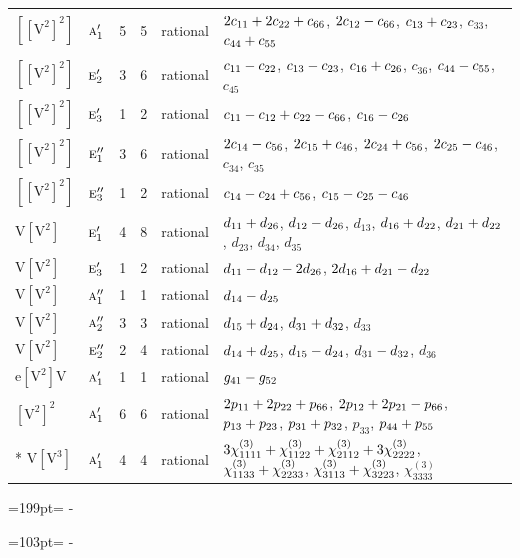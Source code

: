 \documentclass[10pt,a4paper]{article}
\newcommand{\needspace}[1]{\par\penalty-100\begingroup\dimen0=#1\relax\dimen2=\pagegoal
  \advance\dimen2-\pagetotal\ifdim\dimen0>\dimen2\relax\ifdim\dimen2>0pt\vfil\break\fi\fi
  \endgroup}
\numberwithin{equation}{section}
\newcommand{\irr}[1]{\text{\normalfont\scshape #1}}
\newcommand{\jahn}[1]{\mathrm{#1}}
\newlength{\fillwidth}\newlength{\cellwidth}\newlength{\colwidth}
\newcommand{\signbreak}{\penalty100\relax}
\begin{document}
{\begin{longtable}{@{}llrrl>{\RaggedRight\arraybackslash}p{\fillwidth}@{}}
$\jahn{[[V^{2}]^{2}]}$ & $\irr{a}_{1}'$ & 5 & 5 & rational & $2c_{11} +\signbreak 2c_{22} +\signbreak c_{66}$, $2c_{12} -\signbreak c_{66}$, $c_{13} +\signbreak c_{23}$, $c_{33}$, $c_{44} +\signbreak c_{55}$\\
$\jahn{[[V^{2}]^{2}]}$ & $\irr{e}_{2}'$ & 3 & 6 & rational & $c_{11} -\signbreak c_{22}$, $c_{13} -\signbreak c_{23}$, $c_{16} +\signbreak c_{26}$, $c_{36}$, $c_{44} -\signbreak c_{55}$, $c_{45}$\\
$\jahn{[[V^{2}]^{2}]}$ & $\irr{e}_{3}'$ & 1 & 2 & rational & $c_{11} -\signbreak c_{12} +\signbreak c_{22} -\signbreak c_{66}$, $c_{16} -\signbreak c_{26}$\\
$\jahn{[[V^{2}]^{2}]}$ & $\irr{e}_{1}''$ & 3 & 6 & rational & $2c_{14} -\signbreak c_{56}$, $2c_{15} +\signbreak c_{46}$, $2c_{24} +\signbreak c_{56}$, $2c_{25} -\signbreak c_{46}$, $c_{34}$, $c_{35}$\\
$\jahn{[[V^{2}]^{2}]}$ & $\irr{e}_{3}''$ & 1 & 2 & rational & $c_{14} -\signbreak c_{24} +\signbreak c_{56}$, $c_{15} -\signbreak c_{25} -\signbreak c_{46}$\\
$\jahn{V[V^{2}]}$ & $\irr{e}_{1}'$ & 4 & 8 & rational & $d_{11} +\signbreak d_{26}$, $d_{12} -\signbreak d_{26}$, $d_{13}$, $d_{16} +\signbreak d_{22}$, $d_{21} +\signbreak d_{22}$, $d_{23}$, $d_{34}$, $d_{35}$\\
$\jahn{V[V^{2}]}$ & $\irr{e}_{3}'$ & 1 & 2 & rational & $d_{11} -\signbreak d_{12} -\signbreak 2d_{26}$, $2d_{16} +\signbreak d_{21} -\signbreak d_{22}$\\
$\jahn{V[V^{2}]}$ & $\irr{a}_{1}''$ & 1 & 1 & rational & $d_{14} -\signbreak d_{25}$\\
$\jahn{V[V^{2}]}$ & $\irr{a}_{2}''$ & 3 & 3 & rational & $d_{15} +\signbreak d_{24}$, $d_{31} +\signbreak d_{32}$, $d_{33}$\\
$\jahn{V[V^{2}]}$ & $\irr{e}_{2}''$ & 2 & 4 & rational & $d_{14} +\signbreak d_{25}$, $d_{15} -\signbreak d_{24}$, $d_{31} -\signbreak d_{32}$, $d_{36}$\\
$\jahn{e[V^{2}]V}$ & $\irr{a}_{1}'$ & 1 & 1 & rational & $\mathnormal{g}_{41} -\signbreak \mathnormal{g}_{52}$\\
$\jahn{[V^{2}]^{2}}$ & $\irr{a}_{1}'$ & 6 & 6 & rational & $2p_{11} +\signbreak 2p_{22} +\signbreak p_{66}$, $2p_{12} +\signbreak 2p_{21} -\signbreak p_{66}$, $p_{13} +\signbreak p_{23}$, $p_{31} +\signbreak p_{32}$, $p_{33}$, $p_{44} +\signbreak p_{55}$\\*
$\jahn{V[V^{3}]}$ & $\irr{a}_{1}'$ & 4 & 4 & rational & $3\chi^{(3)}_{1111} +\signbreak \chi^{(3)}_{1122} +\signbreak \chi^{(3)}_{2112} +\signbreak 3\chi^{(3)}_{2222}$, $\chi^{(3)}_{1133} +\signbreak \chi^{(3)}_{2233}$, $\chi^{(3)}_{3113} +\signbreak \chi^{(3)}_{3223}$, $\chi^{(3)}_{3333}$\\
\bottomrule\end{longtable}}
\needspace{199pt}
\needspace{103pt}
\end{document}
